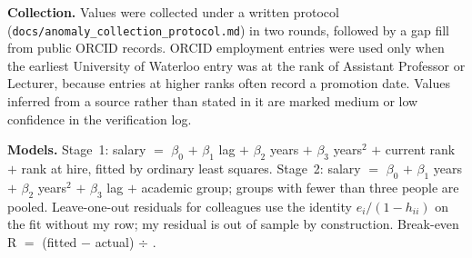 \documentclass{article}
\begin{document}
\textbf{Collection.} Values were collected under a written protocol (\texttt{docs/anomaly\_collection\_protocol.md}) in two rounds, followed by a gap fill from public ORCID records. ORCID employment entries were used only when the earliest University of Waterloo entry was at the rank of Assistant Professor or Lecturer, because entries at higher ranks often record a promotion date. Values inferred from a source rather than stated in it are marked medium or low confidence in the verification log.

\textbf{Models.} Stage~1: salary $=$ $\beta_0$ $+$ $\beta_1$ lag $+$ $\beta_2$ years $+$ $\beta_3$ years$^2$ $+$ current rank $+$ rank at hire, fitted by ordinary least squares. Stage~2: salary $=$ $\beta_0$ $+$ $\beta_1$ years $+$ $\beta_2$ years$^2$ $+$ $\beta_3$ lag $+$ academic group; groups with fewer than three people are pooled. Leave-one-out residuals for colleagues use the identity $e_i/(1-h_{ii})$ on the fit without my row; my residual is out of sample by construction. Break-even R $=$ (fitted $-$ actual) $\div$ \WGRCoef.
\end{document}
